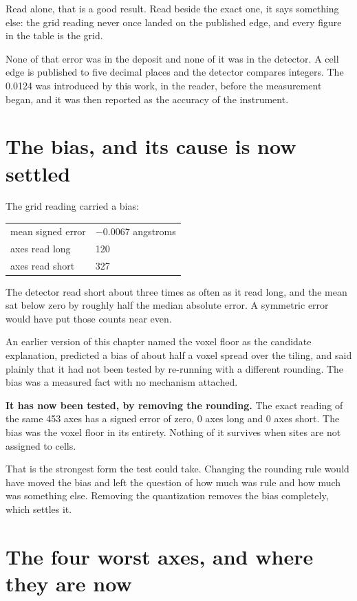 Read alone, that is a good result. Read beside the exact one, it says something else: the grid reading never once landed on the published edge, and every figure in the table is the grid.

None of that error was in the deposit and none of it was in the detector. A cell edge is published to five decimal places and the detector compares integers. The 0.0124 was introduced by this work, in the reader, before the measurement began, and it was then reported as the accuracy of the instrument.

\section{The bias, and its cause is now settled}

The grid reading carried a bias:

\begin{longtable}{@{}p{}p{}@{}}
\toprule
\endhead
mean signed error & $-0.0067$ angstroms \\
axes read long & 120 \\
axes read short & 327 \\
\bottomrule
\end{longtable}

The detector read short about three times as often as it read long, and the mean sat below zero by roughly half the median absolute error. A symmetric error would have put those counts near even.

An earlier version of this chapter named the voxel floor as the candidate explanation, predicted a bias of about half a voxel spread over the tiling, and said plainly that it had not been tested by re-running with a different rounding. The bias was a measured fact with no mechanism attached.

\textbf{It has now been tested, by removing the rounding.} The exact reading of the same 453 axes has a signed error of zero, 0 axes long and 0 axes short. The bias was the voxel floor in its entirety. Nothing of it survives when sites are not assigned to cells.

That is the strongest form the test could take. Changing the rounding rule would have moved the bias and left the question of how much was rule and how much was something else. Removing the quantization removes the bias completely, which settles it.

\section{The four worst axes, and where they are now}

